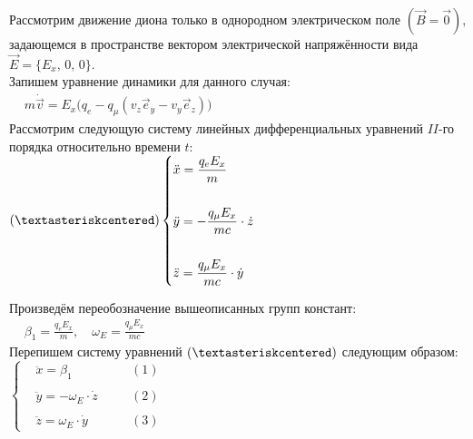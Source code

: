 \documentclass[oneside,final,14pt]{extarticle}
\begin{document}
		\noindent Рассмотрим движение диона только в однородном электрическом поле $(\vec{B} = \vec{0})$, задающемся в пространстве вектором электрической напряжённости вида $\vec{E} = \{E_{x},\, 0,\, 0\}$. \\
		
		\noindent Запишем уравнение динамики для данного случая: \\
		
		\begin{math}
			\begin{aligned}
				& m\dot{\vec{v}} = E_{x}\Big(q_{e} - q_{\mu}\left(v_{z}\vec{e}_{y} - v_{y}\vec{e}_{z}\right)\Big)
			\end{aligned}
		\end{math} \\
		
		\noindent Рассмотрим следующую систему линейных дифференциальных уравнений $II$-го порядка относительно времени $t$: \\
		
		\begin{math}
			(\textasteriskcentered) \left\{
			\begin{aligned}
				& \ddot{x} = \frac{q_{e}E_{x}}{m} \\\\
				& \ddot{y} = -\frac{q_{\mu}E_{x}}{mc} \cdot \dot{z} \\\\
				& \ddot{z} = \frac{q_{\mu}E_{x}}{mc} \cdot \dot{y}
			\end{aligned}
			\right.
		\end{math}
		
		\newpage
		\noindent Произведём переобозначение вышеописанных групп констант: \\
		
		\begin{math}
			\begin{aligned}
				& \beta_{1} = \frac{q_{e}E_{x}}{m}, \quad \omega_{E} = \frac{q_{\mu}E_{x}}{mc}
			\end{aligned}
		\end{math} \\
		
		\noindent Перепишем систему уравнений $(\textasteriskcentered)$ следующим образом: \\
		
		\begin{math}
			\left\{
			\begin{aligned}
				& \ddot{x} = \beta_{1} \quad && (1) \\\\
				& \ddot{y} = -\omega_{E} \cdot \dot{z} \quad && (2) \\\\
				& \ddot{z} = \omega_{E} \cdot \dot{y} \quad && (3)
			\end{aligned}
			\right.
		\end{math} \\\\
		
\end{document}
